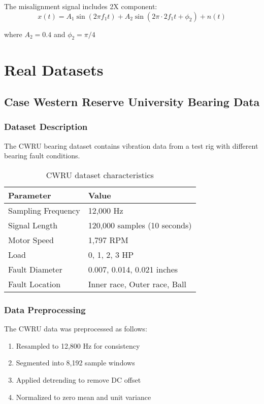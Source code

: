 The misalignment signal includes 2X component:
\begin{equation}
x(t) = A_1 \sin(2\pi f_1 t) + A_2 \sin(2\pi \cdot 2f_1 t + \phi_2) + n(t)
\end{equation}

where $A_2 = 0.4$ and $\phi_2 = \pi/4$

\section{Real Datasets}

\subsection{Case Western Reserve University Bearing Data}

\subsubsection{Dataset Description}

The CWRU bearing dataset contains vibration data from a test rig with different bearing fault conditions.

\begin{table}[H]
\centering
\caption{CWRU dataset characteristics}
\label{tab:cwru_dataset}
\begin{tabular}{@{}ll@{}}
\toprule
Parameter & Value \\
\midrule
Sampling Frequency & 12,000 Hz \\
Signal Length & 120,000 samples (10 seconds) \\
Motor Speed & 1,797 RPM \\
Load & 0, 1, 2, 3 HP \\
Fault Diameter & 0.007, 0.014, 0.021 inches \\
Fault Location & Inner race, Outer race, Ball \\
\bottomrule
\end{tabular}
\end{table}

\subsubsection{Data Preprocessing}

The CWRU data was preprocessed as follows:
\begin{enumerate}
    \item Resampled to 12,800 Hz for consistency
    \item Segmented into 8,192 sample windows
    \item Applied detrending to remove DC offset
    \item Normalized to zero mean and unit variance
\end{enumerate}

